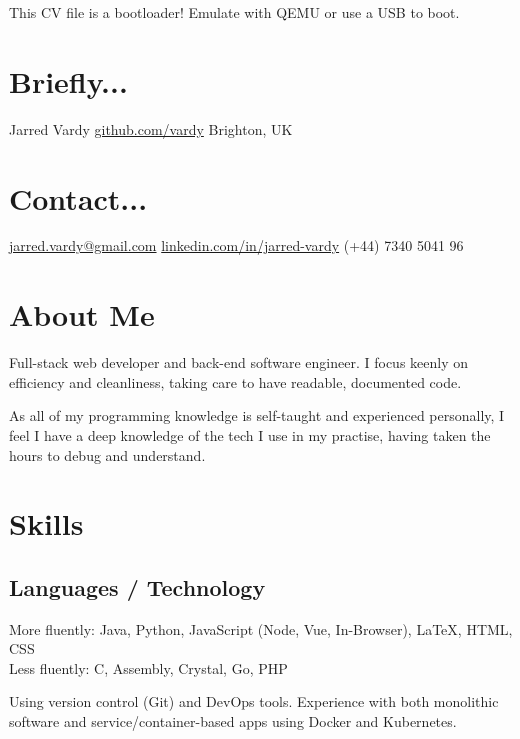 \documentclass[]{jvcv}
\begin{document}
       {This CV file is a bootloader! Emulate with QEMU or use a USB to boot.}


%
\begin{aside}
	\section{Briefly...}\vspace{0.1cm}
	Jarred Vardy
	\hyperref[https://github.com/vardy/]{github.com/vardy}
	Brighton, UK
	\section{Contact...}\vspace{0.1cm}
	\hyperref[mailto:jarred.vardy@gmail.com]{jarred.vardy@gmail.com}
	\hyperref[https://linkedin.com/in/jarred-vardy]{linkedin.com/in/jarred-vardy}
	(+44) 7340 5041 96
\end{aside}

%
\section{About Me}
Full-stack web developer and back-end software engineer.
I focus keenly on efficiency and cleanliness, taking care to have readable, documented code.

As all of my programming knowledge is self-taught and experienced personally, I feel I have a
deep knowledge of the tech I use in my practise, having taken the hours to debug and understand.

%
\vspace{0.5cm}
\section{Skills}
\subsection{Languages / Technology}
More fluently: Java, Python, JavaScript (Node, Vue, In-Browser), LaTeX, HTML, CSS\\
Less fluently: C, Assembly, Crystal, Go, PHP

Using version control (Git) and DevOps tools. Experience with both monolithic software 
and service/container-based apps using Docker and Kubernetes.
\end{document}
